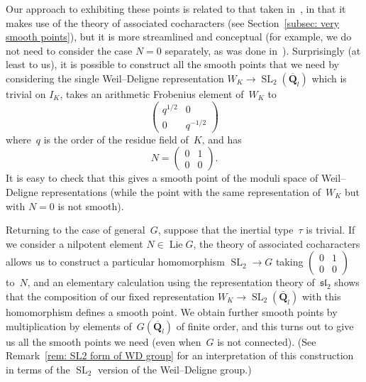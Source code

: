 \documentclass{amsart}
\renewcommand{\mathbb}{\mathbf}
\renewcommand{\ell}{l}
\DeclareMathOperator{\Lie}{Lie}
\DeclareMathOperator{\SL}{SL}
\def\sl{\mathfrak{sl}}
\def\sl{\mathfrak{sl}}
\theoremstyle{definition}
\theoremstyle{remark}
\newcommand{\mar}[1]{}
\newcommand{\mar}[1]{\marginpar{\raggedright\tiny squirrel #1}}
\newcommand{\Q}{\QQ}
\newcommand{\QQ}{{\mathbb Q}}
\newcommand{\Qbar}{\overline{\Q}}
\newcommand{\Qlbar}{\Qbar_{\ell}}
\def\sl{\mathfrak{sl}}
\begin{document}
Our approach to exhibiting these points is related to that taken
in~\cite{2014arXiv1403.1411B}, in that it makes use of the theory of
associated cocharacters (see Section~\ref{subsec: very
  smooth points}), but it is more streamlined and conceptual (for
example, we do not need to  consider the case $N=0$ separately, as was
done in~\cite{2014arXiv1403.1411B}). Surprisingly (at least to us), it
is possible to construct all the smooth points that we need by
considering the single Weil--Deligne representation
$W_K\to\SL_2(\Qlbar)$ which is trivial on $I_K$, takes an arithmetic
Frobenius element of~$W_K$ to \[
  \begin{pmatrix}
    q^{1/2}&0\\0&q^{-1/2}
  \end{pmatrix}
\]where~$q$ is the order of the residue field of~$K$, and has \[N=
  \begin{pmatrix}
    0&1\\0&0
  \end{pmatrix}.\] %
It is easy to check
that this gives a smooth point of the moduli space of Weil--Deligne representations (while the point with the same
representation of~$W_K$ but with $N=0$ is not smooth). 

Returning to the case of general~$G$, suppose that the inertial
type~$\tau$ is trivial. If we consider a nilpotent element $N\in \Lie G$,
the theory of associated cocharacters allows us to construct a particular
homomorphism $\SL_2\to G$ taking $\begin{pmatrix} 0&1\\0&0
\end{pmatrix}$ to~$N$, and an elementary calculation using the
representation theory of~$\sl_2$  shows that the composition of
our fixed representation $W_K\to\SL_2(\Qlbar)$ with this homomorphism
defines a smooth point. We obtain further smooth points by
multiplication by elements of~$G(\Qlbar)$ of finite order, and this turns out
to give us all the smooth points we need (even when~$G$ is not
connected). (See Remark~\ref{rem: SL2 form of WD group} for an
interpretation of this construction in terms of the $\SL_2$ version of
the Weil--Deligne group.)
\end{document}
